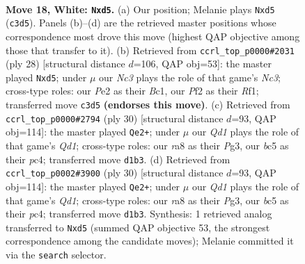\documentclass[11pt]{article}
\begin{document}
\clearpage

\begin{figure}[p]\centering
\begin{subfigure}{0.46\textwidth}\centering
\resizebox{\linewidth}{!}{%
\newchessgame
\chessboard[
  setfen={rnbqk1r1/8/5n2/ppbp1pB1/8/2N3P1/PP2PPB1/R2QNRK1 w q - 1 18},
  showmover=false,
  pgfstyle=straightmove, color=movearrow, markmove={c3-d5}
]}
\caption{}
\end{subfigure}\hfill
\begin{subfigure}{0.46\textwidth}\centering
\resizebox{\linewidth}{!}{%
\newchessgame
\chessboard[
  setfen={r2qk2r/1p2bppp/pnn5/3p3b/4B3/2N2N1P/PP3PP1/R1BQ1RK1 w kq - 0 15},
  showmover=false,
  pgfstyle=straightmove, color=movearrow, markmove={c3-d5}
]}
\caption{}
\end{subfigure}
\\[4pt]
\begin{subfigure}{0.46\textwidth}\centering
\resizebox{\linewidth}{!}{%
\newchessgame
\chessboard[
  setfen={r2qk2r/pb3p2/5n1b/1ppp2B1/2p4P/2N3P1/PP3PB1/R2QK2R w KQkq - 0 16},
  showmover=false,
  pgfstyle=straightmove, color=movearrow, markmove={d1-e2}
]}
\caption{}
\end{subfigure}\hfill
\begin{subfigure}{0.46\textwidth}\centering
\resizebox{\linewidth}{!}{%
\newchessgame
\chessboard[
  setfen={r2qk2r/pb3p2/5n1b/1ppp2B1/2p4P/2N3P1/PP3PB1/R2QK2R w KQkq - 0 16},
  showmover=false,
  pgfstyle=straightmove, color=movearrow, markmove={d1-e2}
]}
\caption{}
\end{subfigure}
\caption{\textbf{Move 18, White: \texttt{Nxd5}.} (a) Our position; Melanie plays \texttt{Nxd5} (\texttt{c3d5}). Panels (b)--(d) are the retrieved master positions whose correspondence most drove this move (highest QAP objective among those that transfer to it). (b) Retrieved from \texttt{ccrl\_top\_p0000\#2031} (ply 28) [structural distance $d$=106, QAP obj=53]: the master played \texttt{Nxd5}; under $\mu$ our \emph{Nc3} plays the role of that game's \emph{Nc3}; cross-type roles: our \emph{P}e2 as their \emph{B}c1, our \emph{P}f2 as their \emph{R}f1; transferred move \texttt{c3d5} \textbf{(endorses this move)}. (c) Retrieved from \texttt{ccrl\_top\_p0000\#2794} (ply 30) [structural distance $d$=93, QAP obj=114]: the master played \texttt{Qe2+}; under $\mu$ our \emph{Qd1} plays the role of that game's \emph{Qd1}; cross-type roles: our \emph{r}a8 as their \emph{P}g3, our \emph{b}c5 as their \emph{p}c4; transferred move \texttt{d1b3}. (d) Retrieved from \texttt{ccrl\_top\_p0002\#3900} (ply 30) [structural distance $d$=93, QAP obj=114]: the master played \texttt{Qe2+}; under $\mu$ our \emph{Qd1} plays the role of that game's \emph{Qd1}; cross-type roles: our \emph{r}a8 as their \emph{P}g3, our \emph{b}c5 as their \emph{p}c4; transferred move \texttt{d1b3}. Synthesis: 1 retrieved analog transferred to \texttt{Nxd5} (summed QAP objective 53, the strongest correspondence among the candidate moves); Melanie committed it via the \texttt{search} selector.}
\label{fig:thought-m34}
\end{figure}
\end{document}
